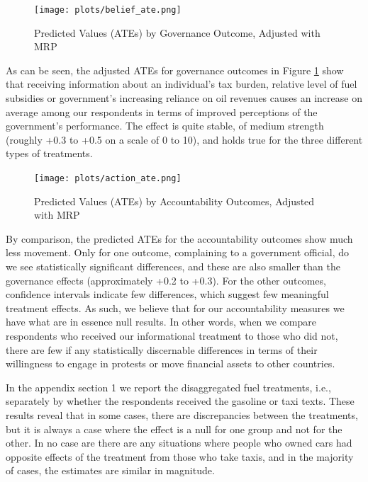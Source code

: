 \documentclass[12pt, letterpaper]{article}
\begin{document}
\begin{figure}
    \centering
    \texttt{[image: plots/belief\_ate.png]}
    \caption{Predicted Values (ATEs) by Governance Outcome, Adjusted with MRP}
    \label{fig:beliefate}
\end{figure}

As can be seen, the adjusted ATEs for governance outcomes in Figure \ref{fig:beliefate} show that receiving information about an individual's tax burden, relative level of fuel subsidies or government's increasing reliance on oil revenues causes an increase on average among our respondents in terms of improved perceptions of the government's performance. The effect is quite stable, of medium strength (roughly +0.3 to +0.5 on a scale of 0 to 10), and holds true for the three different types of treatments. 


\begin{figure}
    \centering
    \texttt{[image: plots/action\_ate.png]}
    \caption{Predicted Values (ATEs) by Accountability Outcomes, Adjusted with MRP}
    \label{fig:actionate}
\end{figure}

By comparison, the predicted ATEs for the accountability outcomes show much less movement. Only for one outcome, complaining to a government official, do we see statistically significant differences, and these are also smaller than the governance effects (approximately +0.2 to +0.3). For the other outcomes, confidence intervals indicate few differences, which suggest few meaningful treatment effects. As such, we believe that for our accountability measures we have what are in essence null results. In other words, when we compare respondents who received our informational treatment to those who did not, there are few if any statistically discernable differences in terms of their willingness to engage in protests or move financial assets to other countries.

In the appendix section 1 we report the disaggregated fuel treatments, i.e., separately by whether the respondents received the gasoline or taxi texts. These results reveal that in some cases, there are discrepancies between the treatments, but it is always a case where the effect is a null for one group and not for the other. In no case are there are any situations where people who owned cars had opposite effects of the treatment from those who take taxis, and in the majority of cases, the estimates are similar in magnitude.
\end{document}
